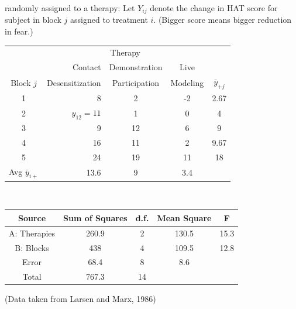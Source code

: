 randomly assigned to a therapy: 
Let $Y_{ij}$ denote the change in HAT score for subject in block $j$ assigned 
to treatment $i$.  (Bigger score means bigger reduction in fear.)
\bigkn
\begin{tabular}{c|rcc|c} \hline
&\multicolumn{3}{|c}{Therapy} & \\ \cline{2-4} 
& Contact & Demonstration & Live & \\
Block $j$ & Desensitization & Participation & Modeling & $\bar{y}_{+j}$ \\ \hline
1 & 8 & 2 & -2 & 2.67\\
2 & $y_{12}=11$ & 1 & 0 & 4 \\
3 & 9 & 12 & 6 & 9 \\
4 & 16 & 11 & 2 & 9.67\\
5 & 24 & 19 & 11 & 18\\ \hline
Avg $\bar{y}_{i+}$ & 13.6 & 9 & 3.4 \\ \hline 
\end{tabular}\\
\newpage
{}
\noindent

\bigkn
\begin{center}
\begin{tabular}{|c|c|c|c|c|} \hline
Source & Sum of Squares & d.f. & Mean Square & F\\ \hline
A: Therapies & 260.9 & 2 & 130.5 & 15.3 \\
B: Blocks & 438 & 4 & 109.5 & 12.8 \\
Error & 68.4 & 8 & 8.6 & \\
Total & 767.3 & 14 & & \\ \hline
\end{tabular} 
\end{center}
(Data taken from Larsen and Marx, 1986)
\bigkn

